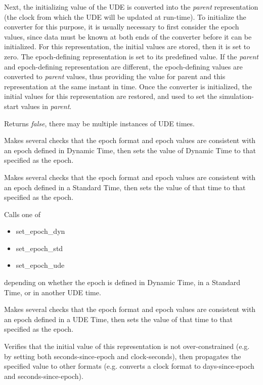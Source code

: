 {\begin{enumerate}
{\begin{enumerate}
Next, the initializing value of the UDE is converted into the
\textit{parent} representation (the clock from which the UDE will be
updated at run-time). To initialize the converter for this purpose, it
is usually necessary to first consider the epoch values, since data
must be known at both ends of the converter before it can be
initialized.  For this representation, the initial values are stored,
then it is set to zero.  The epoch-defining representation is set to
its predefined value.  If the \textit{parent} and epoch-defining
representation are different, the epoch-defining values are converted
to \textit{parent }values, thus providing the value for parent and this
representation at the same instant in time.  Once the converter is
initialized, the initial values for this representation  are restored,
and used to set the simulation-start values in \textit{parent}.

Returns \textit{false}, there may be multiple instances of UDE times.

Makes several checks that the epoch format and epoch values are
consistent with an epoch defined in Dynamic Time, then sets the value
of Dynamic Time to that specified as the epoch.

Makes several checks that the epoch format and epoch values are
consistent with an epoch defined in  a Standard Time, then sets the
value of that time to that specified as the epoch.

Calls one of


\begin{itemize}
\item set\_epoch\_dyn
\item set\_epoch\_std
\item set\_epoch\_ude
\end{itemize}
depending on whether the epoch is defined in Dynamic Time, in a Standard
Time, or in another UDE time.




Makes several checks that the epoch format and epoch values are
consistent with an epoch defined in  a UDE Time, then sets the value of
that time to that specified as the epoch.

Verifies that the initial value of this representation is not
over-constrained (e.g. by setting both seconds-since-epoch and
clock-seconds), then propagates the specified value to other formats
(e.g. converts a clock format to days-since-epoch and
seconds-since-epoch).


\end{enumerate}}
\end{enumerate}}
